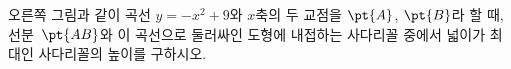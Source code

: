 \noindent\begin{minipage}[t]{0.58\linewidth}\vspace{0pt}\raggedright 오른쪽 그림과 같이 곡선 $y=-x^2+9$와 $x$축의 두 교점을 $\pt{A}$, $\pt{B}$라 할 때, 선분~$\pt{AB}$와 이 곡선으로 둘러싸인 도형에 내접하는 사다리꼴 중에서 넓이가 최대인 사다리꼴의 높이를 구하시오.\end{minipage}\hfill\begin{minipage}[t]{0.4\linewidth}\vspace{0pt}\centering \resizebox{\ifdim\width>\linewidth\linewidth\else\width\fi}{!}{}\end{minipage}\par
